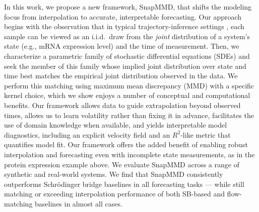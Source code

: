In this work, we propose a new framework, SnapMMD, that shifts the modeling focus from interpolation to accurate, interpretable forecasting. Our approach begins with the observation that in typical trajectory-inference settings \citep{Lavenant2021}, each sample can be viewed as an i.i.d.\ draw from the \emph{joint} distribution of a system's state (e.g., mRNA expression level) and the time of measurement. Then, we characterize a parametric family of stochastic differential equations (SDEs) and seek the member of this family whose implied joint distribution over state and time best matches the empirical joint distribution observed in the data. We perform this matching using maximum mean discrepancy (MMD) with a specific kernel choice, which we show enjoys a number of conceptual and computational benefits.
Our framework allows data to guide extrapolation beyond observed times, allows us to learn volatility rather than fixing it in advance, facilitates the use of domain knowledge when available, and yields interpretable model diagnostics, including an explicit velocity field and an $R^2$-like metric that quantifies model fit. Our framework offers the added benefit of enabling robust interpolation and forecasting even with incomplete state measurements, as in the protein expression example above.
%
%
We evaluate SnapMMD across a range of synthetic and real-world systems. %
We find that SnapMMD consistently outperforms Schrödinger bridge baselines in all forecasting tasks --- while still
matching or exceeding interpolation performance of both SB-based and flow-matching baselines in almost all cases. %
